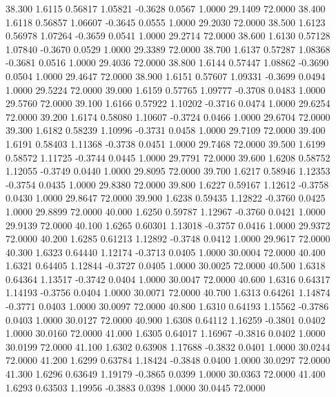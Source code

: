   38.300   1.6115   0.56817   1.05821  -0.3628   0.0567   1.0000  29.1409  72.0000
  38.400   1.6118   0.56857   1.06607  -0.3645   0.0555   1.0000  29.2030  72.0000
  38.500   1.6123   0.56978   1.07264  -0.3659   0.0541   1.0000  29.2714  72.0000
  38.600   1.6130   0.57128   1.07840  -0.3670   0.0529   1.0000  29.3389  72.0000
  38.700   1.6137   0.57287   1.08368  -0.3681   0.0516   1.0000  29.4036  72.0000
  38.800   1.6144   0.57447   1.08862  -0.3690   0.0504   1.0000  29.4647  72.0000
  38.900   1.6151   0.57607   1.09331  -0.3699   0.0494   1.0000  29.5224  72.0000
  39.000   1.6159   0.57765   1.09777  -0.3708   0.0483   1.0000  29.5760  72.0000
  39.100   1.6166   0.57922   1.10202  -0.3716   0.0474   1.0000  29.6254  72.0000
  39.200   1.6174   0.58080   1.10607  -0.3724   0.0466   1.0000  29.6704  72.0000
  39.300   1.6182   0.58239   1.10996  -0.3731   0.0458   1.0000  29.7109  72.0000
  39.400   1.6191   0.58403   1.11368  -0.3738   0.0451   1.0000  29.7468  72.0000
  39.500   1.6199   0.58572   1.11725  -0.3744   0.0445   1.0000  29.7791  72.0000
  39.600   1.6208   0.58752   1.12055  -0.3749   0.0440   1.0000  29.8095  72.0000
  39.700   1.6217   0.58946   1.12353  -0.3754   0.0435   1.0000  29.8380  72.0000
  39.800   1.6227   0.59167   1.12612  -0.3758   0.0430   1.0000  29.8647  72.0000
  39.900   1.6238   0.59435   1.12822  -0.3760   0.0425   1.0000  29.8899  72.0000
  40.000   1.6250   0.59787   1.12967  -0.3760   0.0421   1.0000  29.9139  72.0000
  40.100   1.6265   0.60301   1.13018  -0.3757   0.0416   1.0000  29.9372  72.0000
  40.200   1.6285   0.61213   1.12892  -0.3748   0.0412   1.0000  29.9617  72.0000
  40.300   1.6323   0.64440   1.12174  -0.3713   0.0405   1.0000  30.0004  72.0000
  40.400   1.6321   0.64405   1.12844  -0.3727   0.0405   1.0000  30.0025  72.0000
  40.500   1.6318   0.64364   1.13517  -0.3742   0.0404   1.0000  30.0047  72.0000
  40.600   1.6316   0.64317   1.14193  -0.3756   0.0404   1.0000  30.0071  72.0000
  40.700   1.6313   0.64261   1.14874  -0.3771   0.0403   1.0000  30.0097  72.0000
  40.800   1.6310   0.64193   1.15562  -0.3786   0.0403   1.0000  30.0127  72.0000
  40.900   1.6308   0.64112   1.16259  -0.3801   0.0402   1.0000  30.0160  72.0000
  41.000   1.6305   0.64017   1.16967  -0.3816   0.0402   1.0000  30.0199  72.0000
  41.100   1.6302   0.63908   1.17688  -0.3832   0.0401   1.0000  30.0244  72.0000
  41.200   1.6299   0.63784   1.18424  -0.3848   0.0400   1.0000  30.0297  72.0000
  41.300   1.6296   0.63649   1.19179  -0.3865   0.0399   1.0000  30.0363  72.0000
  41.400   1.6293   0.63503   1.19956  -0.3883   0.0398   1.0000  30.0445  72.0000
